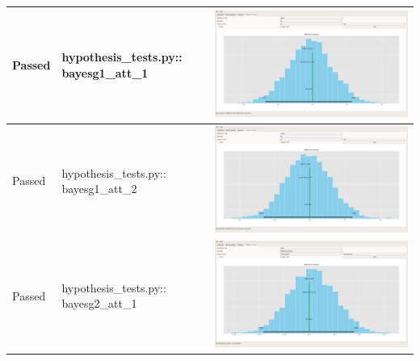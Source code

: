\documentclass[11pt]{report}
\begin{document}
\begin{longtable}{|l|p{6.5cm}|C|}
\color{ForestGreen}Passed & hypothesis\_tests.py:: bayesg1\_att\_1 & \includegraphics[width=.9\linewidth]{./images/Screenshots/hypothesis_bayestest_g1_att_1.png}\\
\hline
\color{ForestGreen}Passed & hypothesis\_tests.py:: bayesg1\_att\_2 & \includegraphics[width=.9\linewidth]{./images/Screenshots/hypothesis_bayestest_g1_att_2.png}\\
\hline
\color{ForestGreen}Passed & hypothesis\_tests.py:: bayesg2\_att\_1 & \includegraphics[width=.9\linewidth]{./images/Screenshots/hypothesis_bayestest_g2_att_1.png}\\
\hline

\end{longtable}
\end{document}
